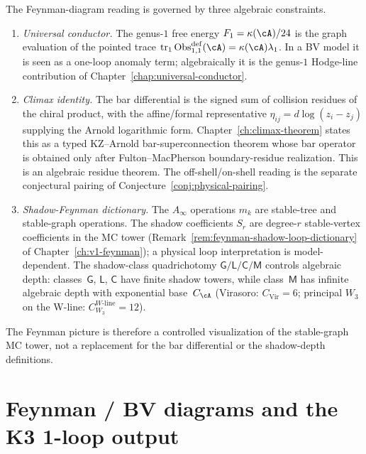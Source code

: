 \begin{remark}
\label{rem:feynman-diagrams-anchors}
The Feynman-diagram reading is governed by three algebraic constraints.
\begin{enumerate}[label=\textup{(\alph*)}]
\item \emph{Universal conductor.} The genus-$1$ free energy
 $F_1=\kappa(\cA)/24$ is the graph evaluation of the pointed trace
 $\operatorname{tr}_1\operatorname{Obs}^{\mathrm{def}}_{1,1}(\cA)
 =\kappa(\cA)\lambda_1$.  In a BV model it is
 seen as a one-loop anomaly term; algebraically it is the genus-$1$
 Hodge-line contribution of Chapter~\ref{chap:universal-conductor}.
\item \emph{Climax identity.} The bar differential is the signed sum
 of collision residues of the chiral product, with the affine/formal
 representative $\eta_{ij}=d\log(z_i-z_j)$ supplying the Arnold
 logarithmic form.  Chapter~\ref{ch:climax-theorem} states this as a
 typed KZ--Arnold bar-superconnection theorem whose bar operator is
 obtained only after Fulton--MacPherson boundary-residue realization.
 This is an algebraic residue theorem.  The off-shell/on-shell reading
 is the separate conjectural pairing of
 Conjecture~\ref{conj:physical-pairing}.
\item \emph{Shadow-Feynman dictionary.} The
 $A_\infty$ operations $m_k$ are stable-tree and stable-graph
 operations.  The shadow coefficients $S_r$ are degree-$r$
 stable-vertex coefficients in the MC tower
 (Remark~\ref{rem:feynman-shadow-loop-dictionary} of
 Chapter~\ref{ch:v1-feynman}); a physical loop interpretation is
 model-dependent.  The shadow-class
 quadrichotomy $\mathsf{G}/\mathsf{L}/\mathsf{C}/\mathsf{M}$
 controls algebraic depth: classes~$\mathsf{G}$,
 $\mathsf{L}$, $\mathsf{C}$ have finite shadow towers, while
 class~$\mathsf{M}$ has infinite algebraic depth with exponential
 base~$C_\cA$
 (Virasoro: $C_{\mathrm{Vir}} = 6$; principal $W_3$ on the
 W-line: $C_{W_3}^{W\text{-line}} = 12$).
\end{enumerate}
The Feynman picture is therefore a controlled visualization of the
stable-graph MC tower, not a replacement for the bar differential or
the shadow-depth definitions.
\end{remark}

\label{sec:summary-feynman-unity}

\section{Feynman / BV diagrams and the K3 1-loop output}
\label{sec:feyn-supplement}

